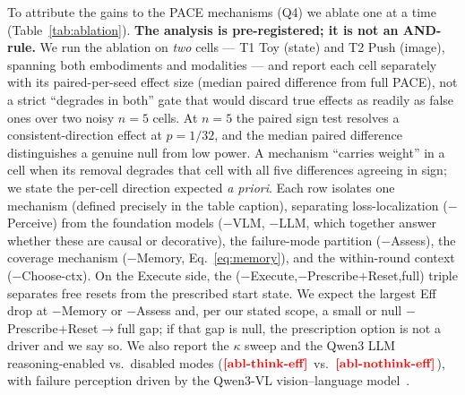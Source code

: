 \documentclass[letterpaper]{article} %
\newcommand{\PH}[1]{{\color{red}\textbf{[#1]}}}
\begin{document}
To attribute the gains to the PACE mechanisms (Q4) we ablate one at a time
(Table~\ref{tab:ablation}). \textbf{The analysis is pre-registered; it is not an
AND-rule.} We run the ablation on \emph{two} cells --- T1 Toy (state) and T2 Push
(image), spanning both embodiments and modalities --- and report each cell separately
with its paired-per-seed effect size (median paired difference from full PACE), not a
strict ``degrades in both'' gate that would discard true effects as readily as false
ones over two noisy $n{=}5$ cells. At $n{=}5$ the paired sign test resolves a
consistent-direction effect at $p{=}1/32$, and the median paired difference
distinguishes a genuine null from low power. A mechanism ``carries weight'' in a cell
when its removal degrades that cell with all five differences agreeing in sign; we
state the per-cell direction expected \emph{a priori}. Each row isolates one
mechanism (defined precisely in the table caption), separating loss-localization
($-$Perceive) from the foundation models ($-$VLM, $-$LLM, which together answer
whether these are causal or decorative), the failure-mode partition ($-$Assess), the
coverage mechanism ($-$Memory, Eq.~\ref{eq:memory}), and the within-round context
($-$Choose-ctx). On the Execute side, the ($-$Execute,$-$Prescribe$+$Reset,full)
triple separates free resets from the prescribed start state. We expect the largest
Eff drop at $-$Memory or $-$Assess and, per our stated scope, a small or null
$-$Prescribe$+$Reset$\to$full gap; if that gap is null, the prescription option is not
a driver and we say so. We also report the $\kappa$ sweep and the Qwen3
LLM~\cite{yang2025qwen3} reasoning-enabled vs.\ disabled modes ($\PH{abl-think-eff}$
vs.\ $\PH{abl-nothink-eff}$), with failure perception driven by the Qwen3-VL
vision--language model~\cite{bai2025qwen3vl}.
\end{document}
